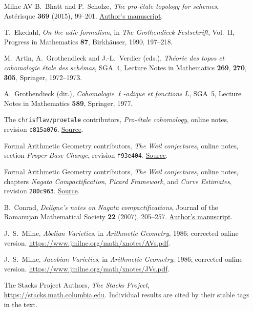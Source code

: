\documentclass[11pt,a4paper]{article}
\numberwithin{equation}{section}
\theoremstyle{definition}
\theoremstyle{remark}
\begin{document}
{}
\begin{thebibliography}{Milne AV}
B.~Bhatt and P.~Scholze,
\emph{The pro-\'etale topology for schemes},
Ast\'erisque \textbf{369} (2015), 99--201.
\href{https://people.mpim-bonn.mpg.de/scholze/proetale.pdf}{Author's manuscript}.

T.~Ekedahl, \emph{On the adic formalism},
in \emph{The Grothendieck Festschrift}, Vol.~II,
Progress in Mathematics \textbf{87}, Birkh\"auser, 1990, 197--218.

M.~Artin, A.~Grothendieck and J.-L.~Verdier (eds.),
\emph{Th\'eorie des topos et cohomologie \'etale des sch\'emas},
SGA~4, Lecture Notes in Mathematics \textbf{269}, \textbf{270},
\textbf{305}, Springer, 1972--1973.

A.~Grothendieck (dir.),
\emph{Cohomologie $\ell$-adique et fonctions $L$},
SGA~5, Lecture Notes in Mathematics \textbf{589}, Springer, 1977.

The \texttt{chrisflav/proetale} contributors, \emph{Pro-\'etale cohomology},
online notes, revision \texttt{c815a076}.
\href{https://github.com/chrisflav/proetale/tree/c815a07678fc5937809e6d4c8af78a107b064056/blueprint/ProetaleBlueprint/Chapters}{Source}.

Formal Arithmetic Geometry contributors, \emph{The Weil conjectures},
online notes, section \emph{Proper Base Change}, revision \texttt{f93e404}.
\href{https://github.com/formal-arithmetic-geometry/weil-conjectures-blueprint/tree/f93e4044b15d3e66893be38fa472491956ffaf83/blueprint/sec-proper-base-change}{Source}.

Formal Arithmetic Geometry contributors, \emph{The Weil conjectures},
online notes, chapters \emph{Nagata Compactification}, \emph{Picard Framework},
and \emph{Curve Estimates}, revision \texttt{280c963}.
\href{https://github.com/formal-arithmetic-geometry/weil-conjectures-blueprint/tree/280c9634916fe1c920d86c56068cd0c41f2007bf/blueprint}{Source}.

B.~Conrad, \emph{Deligne's notes on Nagata compactifications},
Journal of the Ramanujan Mathematical Society \textbf{22} (2007), 205--257.
\href{https://math.stanford.edu/~conrad/papers/nagatafinal.pdf}{Author's manuscript}.

J.~S.~Milne, \emph{Abelian Varieties}, in \emph{Arithmetic Geometry},
1986; corrected online version.
\url{https://www.jmilne.org/math/xnotes/AVs.pdf}.

J.~S.~Milne, \emph{Jacobian Varieties}, in \emph{Arithmetic Geometry},
1986; corrected online version.
\url{https://www.jmilne.org/math/xnotes/JVs.pdf}.

The Stacks Project Authors, \emph{The Stacks Project},
\url{https://stacks.math.columbia.edu}.
Individual results are cited by their stable tags in the text.
\end{thebibliography}
\end{document}

